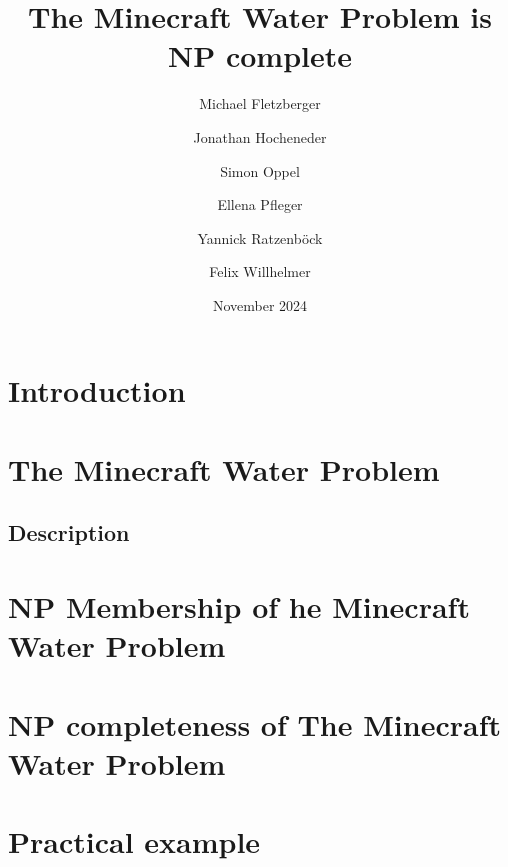 \documentclass{article}
\title{The Minecraft Water Problem is NP complete}
\author{Michael Fletzberger \and Jonathan Hocheneder \and Simon Oppel \and Ellena Pfleger \and Yannick Ratzenböck \and Felix Willhelmer}
\date{November 2024}
\begin{document}
\maketitle

\tableofcontents
\newpage

\section{Introduction}
\newpage

\section{The Minecraft Water Problem}

\subsection{Description}

\newpage

\section{NP Membership of he Minecraft Water Problem}

\newpage

\section{NP completeness of The Minecraft Water Problem}

\newpage

\section{Practical example}

\newpage
\end{document}
